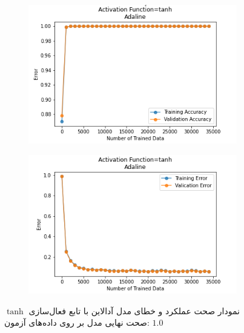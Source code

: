 \documentclass[12pt, a4paper]{article}
\begin{document}
\begin{figure}[h]
    \begin{subfigure}{0.45\linewidth}
        \centering
        \includegraphics[width=\linewidth]{images/3/adaline/activation_func/tanh_acc.png}
    \end{subfigure}
    \hfil
    \begin{subfigure}{0.45\linewidth}
        \centering
        \includegraphics[width=\linewidth]{images/3/adaline/activation_func/tanh_error.png}
    \end{subfigure}
    \caption{نمودار صحت عملکرد‌ و خطای مدل آدالاین با تابع فعال‌سازی $\tanh$
    \newline
    صحت نهایی مدل بر روی داده‌های آزمون: $1.0$}
\end{figure}
\end{document}

